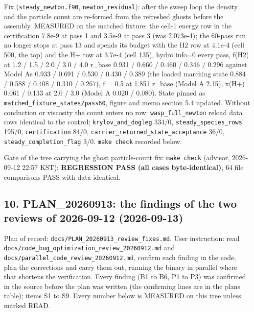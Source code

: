 \documentclass[english,a4paper]{my_memo}
\begin{document}
Fix (\texttt{steady\_newton.f90}, \texttt{newton\_residual}): after the sweep loop the
density and the particle count are re-formed from the refreshed ghosts
before the assembly. MEASURED on the matched fixture: the cell-1 energy row
in the certification 7.8e-9 at pass 1 and 3.5e-9 at pass 3 (was 2.073e-4);
the 60-pass run no longer stops at pass 13 and spends its budget with the
H2 row at 4.1e-4 (cell 500, the top) and the H+ row at 3.7e-4 (cell 135),
hydro info=0 every pass, f(H2) at 1.2 / 1.5 / 2.0 / 3.0 / 4.0 r\_base
0.931 / 0.660 / 0.460 / 0.346 / 0.296 against Model A\textquotesingle s 0.933 / 0.691 /
0.530 / 0.430 / 0.389 (the loaded marching state 0.884 / 0.588 / 0.408 /
0.310 / 0.267), f = 0.5 at 1.851 r\_base (Model A 2.15), x(H+) 0.061 /
0.133 at 2.0 / 3.0 (Model A 0.020 / 0.080). State pinned as
\texttt{matched\_fixture\_states/pass60}, figure and memo section 5.4 updated.
Without conduction or viscosity the count enters no row: \texttt{wasp\_full\_newton}
reload data rows identical to the control; \texttt{krylov\_and\_dogleg} 334/0,
\texttt{steady\_species\_rows} 195/0, \texttt{certification} 84/0,
\texttt{carrier\_returned\_state\_acceptance} 36/0, \texttt{steady\_completion\_flag} 3/0.
\texttt{make\ check} recorded below.

Gate of the tree carrying the ghost particle-count fix: \texttt{make\ check}
(advisor, 2026-09-12 22:57 KST): \textbf{REGRESSION PASS (all cases
byte-identical)}, 64 file comparisons PASS with data identical.

\subsection{10. PLAN\_20260913: the findings of the two reviews of 2026-09-12 (2026-09-13)}\label{10-plan_20260913-the-findings-of-the-two-reviews-of-2026-09-12-2026-09-13}

Plan of record: \texttt{docs/PLAN\_20260913\_review\_fixes.md}. User instruction: read
\texttt{docs/code\_bug\_optimization\_review\_20260912.md} and
\texttt{docs/parallel\_code\_review\_20260912.md}, confirm each finding in the code,
plan the corrections and carry them out, running the binary in parallel
where that shortens the verification. Every finding (B1 to B6, P1 to P3) was
confirmed in the source before the plan was written (the confirming lines
are in the plan\textquotesingle s table); items S1 to S9. Every number below is MEASURED on
this tree unless marked READ.
\end{document}
